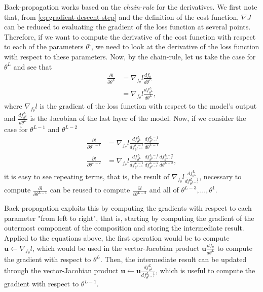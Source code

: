 Back-propagation works based on the \emph{chain-rule} for the derivatives.
We first note that, from \eqref{eq:gradient-descent-step} and the definition of the cost function, $\nabla J$ can be reduced to evaluating the gradient of the loss function at several points.
Therefore, if we want to compute the derivative of the cost function with respect to each of the parameters $\theta^i$, we need to look at the derivative of the loss function with respect to these parameters.
Now, by the chain-rule, let us take the case for $\theta^L$ and see that
 \begin{align*}
     \frac{\partial l}{\partial\theta^L} &= \nabla_{f_\theta} l \frac{d f_\theta}{d \theta^L} \\
     &= \nabla_{f_\theta} l \frac{d f^L_{\theta^L}}{d \theta^L}
,\end{align*}
where $\nabla_{f_\theta} l$ is the gradient of the loss function with respect to the model's output and $\frac{d f^L_{\theta^L}}{d \theta^L}$ is the Jacobian of the last layer of the model. Now, if we consider the case for $\theta^{L-1}$ and $\theta^{L-2}$
 \begin{align*}
     \frac{\partial l}{\partial\theta^{L-1}} &= \nabla_{f_\theta} l \frac{d f^L_{\theta^L}}{d f^{L-1}_{\theta^{L-1}}} \frac{d f^{L-1}_{\theta^{L-1}}}{d \theta^{L-1}} \\
     \frac{\partial l}{\partial\theta^{L-2}} &= \nabla_{f_\theta} l \frac{d f^L_{\theta^L}}{d f^{L-1}_{\theta^{L-1}}} \frac{d f^{L-1}_{\theta^{L-1}}}{d f^{L-2}_{\theta^{L-2}}} \frac{d f^{L-2}_{\theta^{L-2}}}{d \theta^{L-2}}
,\end{align*}
it is easy to see repeating terms, that is, the result of $\nabla_{f_\theta} l \frac{d f^L_{\theta^L}}{d f^{L-1}_{\theta^{L-1}}}$, necessary to compute $\frac{\partial l}{\partial\theta^{L-1}}$ can be reused to compute $\frac{\partial l}{\partial\theta^{L-2}}$ and all of $\theta^{L-3},\ldots,\theta^1$.

Back-propagation exploits this by computing the gradients with respect to each parameter "from left to right", that is, starting by computing the gradient of the outermost component of the composition and storing the intermediate result.
Applied to the equations above, the first operation would be to compute $\bm{u}\gets\nabla_{f_\theta} l$, which would be used in the vector-Jacobian product $\bm{u} \frac{d f_\theta}{d \theta^L}$ to compute the gradient with respect to $\theta^{L}$.
Then, the intermediate result can be updated through the vector-Jacobian product $\bm{u}\gets \bm{u} \frac{d f^L_{\theta^L}}{d f^{L-1}_{\theta^{L-1}}}$, which is useful to compute the gradient with respect to $\theta^{L-1}$.

